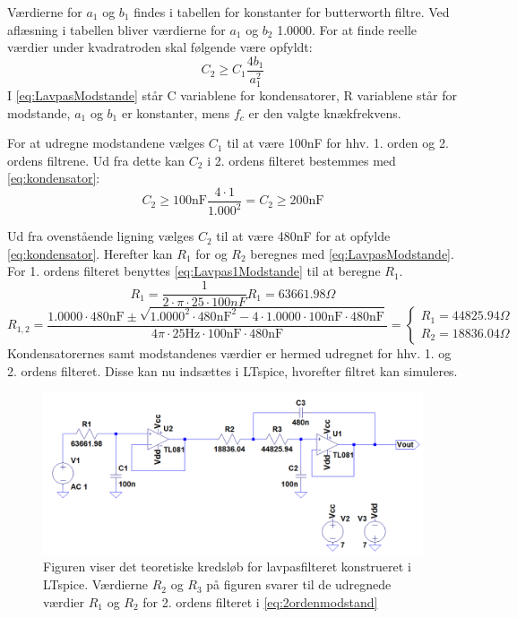 \noindent Værdierne for $a_{1}$ og $b_{1}$ findes i tabellen for konstanter for butterworth filtre. Ved aflæsning i tabellen bliver værdierne for $a_{1}$  og  $b_{2}$ 1.0000. For at finde reelle værdier under kvadratroden skal følgende være opfyldt:
\begin{equation} \label{eq:kondensator}
C_2 \geq C_1 \frac{4b_1}{a_1^2}
\end{equation}
I \eqref{eq:LavpasModstande} står C variablene for kondensatorer, R variablene står for modstande, $a_1$ og $b_1$ er konstanter, mens $f_c$ er den valgte knækfrekvens. 

\noindent For at udregne modstandene vælges $C_1$ til at være 100nF for hhv. 1. orden og 2. ordens filtrene. Ud fra dette kan $C_2$ i 2. ordens filteret bestemmes med \eqref{eq:kondensator}:
\begin{equation} 
C_2 \geq 100\text{nF} \frac{4\cdot 1}{1.000^2} = C_2 \geq 200\text{nF}
\end{equation}

\noindent Ud fra ovenstående ligning vælges $C_2$ til at være 480nF for at opfylde \eqref{eq:kondensator}.  Herefter kan $R_1$ for og $R_2$ beregnes med \eqref{eq:LavpasModstande}. For 1. ordens filteret benyttes \eqref{eq:Lavpas1Modstande} til at beregne $R_1$.
\begin{equation} \label{eq:Lavpas1Modstande}
R_{1} = \frac{1}{2 \cdot \pi \cdot 25 \cdot 100nF} R_{1} = 63661.98 \Omega
\end{equation}
\begin{equation} \label{eq:2ordenmodstand}
R_{1,2} = \frac{1.0000 \cdot 480\text{nF} \pm \sqrt{1.0000^2 \cdot 480\text{nF}^2 - 4 \cdot 1.0000 \cdot 100\text{nF} \cdot 480\text{nF}}}{4 \pi \cdot 25\text{Hz} \cdot 100\text{nF} \cdot 480\text{nF}} = \begin{cases} R_{1} =  44825.94\Omega \\ R_{2} = 18836.04 \Omega \end{cases}
\end{equation}
\noindent Kondensatorernes samt modstandenes værdier er hermed udregnet for hhv. 1. og 2. ordens filteret. Disse kan nu indsættes i LTspice, hvorefter filtret kan simuleres. 

\begin{figure}[H]
	\centering
	\includegraphics[scale=0.58]{figures/cProblemloesning/Lavpasfilter1_LTspice.PNG}
	\caption{Figuren viser det teoretiske kredsløb for lavpasfilteret konstrueret i LTspice. Værdierne $R_{2}$ og $R_{3}$ på figuren svarer til de udregnede værdier $R_{1}$ og $R_{2}$ for 2. ordens filteret i \eqref{eq:2ordenmodstand}}
	\label{fig:lavpasfilter1_LTspice}
\end{figure}

